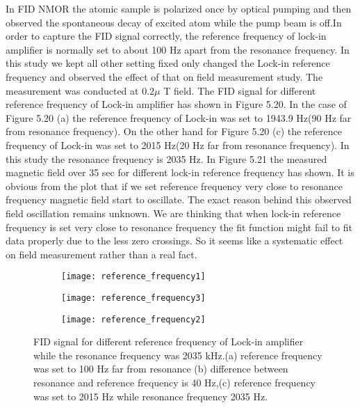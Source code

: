 \documentclass[12pt]{report}
\begin{document}
  In FID NMOR the atomic sample is polarized once by optical pumping and then observed the spontaneous decay of excited atom while the pump beam is off.In order to capture the FID signal correctly, the reference frequency of lock-in amplifier is normally set to about 100 Hz apart from the resonance frequency. In this study we kept all other setting fixed only changed the Lock-in reference frequency and observed the effect of that on field measurement study. The measurement was conducted at $0.2\mu$ T field. The FID signal for different reference frequency of Lock-in amplifier has shown in Figure 5.20. In the case of Figure 5.20 (a) the reference frequency of Lock-in was set to 1943.9 Hz(90 Hz far from resonance frequency). On the other hand for Figure 5.20 (c) the reference frequency of Lock-in was set to 2015 Hz(20 Hz far from resonance frequency). In this study the resonance frequency is 2035 Hz. In Figure 5.21 the measured magnetic field over 35 sec for different lock-in reference frequency has shown. It is obvious from the plot that if we set reference frequency very close to resonance frequency magnetic field start to oscillate. The exact reason behind this observed field oscillation remains unknown. We are thinking that when lock-in reference frequency is set very close to resonance frequency the fit function might fail to fit data properly due to the less zero crossings. So it seems like a systematic effect on field measurement rather than a real fact.
 \begin{figure}
    \centering
    \begin{subfigure}[b]{0.4\textwidth}
        \centering
        \texttt{[image: reference\_frequency1]}
        \caption{}
        \label{fig:three sin x}
    \end{subfigure}
    \hfill
    \begin{subfigure}[b]{0.4\textwidth}
        \centering
        \texttt{[image: reference\_frequency3]}
        \caption{}
        \label{fig:five over x}
    \end{subfigure}
    \begin{subfigure}[b]{0.4\textwidth}
        \centering
        \texttt{[image: reference\_frequency2]}
        \caption{}
        \label{fig:five over x}
    \end{subfigure}
    \caption{FID signal for different reference frequency of Lock-in amplifier while the resonance frequency was 2035 kHz.(a) reference frequency was set to 100 Hz far from resonance (b) difference between resonance and reference frequency is 40 Hz,(c) reference frequency was set to 2015 Hz while resonance frequency 2035 Hz. }
\end{figure}
\end{document}

